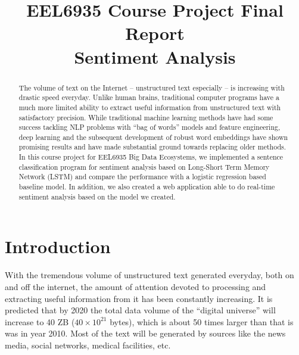 \documentclass[conference]{IEEEtran}
\begin{document}
\renewcommand{\figureautorefname}{Fig.}
\newcommand{\subfigureautorefname}{Fig.}
\renewcommand{\sectionautorefname}{Section}
\renewcommand{\subsectionautorefname}{Section}


\title{EEL6935 Course Project Final Report \\
    Sentiment Analysis}
\author{
}

\maketitle

\begin{abstract}
    The volume of text on the Internet -- unstructured text especially --
    is increasing with drastic speed everyday. Unlike human brains, traditional 
    computer programs have a much more limited ability to extract useful
    information from unstructured text with satisfactory precision.
    While traditional machine learning methods have had some success
    tackling NLP problems with ``bag of words'' models and feature engineering,
    deep learning and the subsequent development of robust word embeddings have shown
    promising results and have made substantial ground towards replacing older methods.
    In this course project for EEL6935 Big Data Ecosystems, we implemented a sentence 
    classification program for sentiment analysis based on Long-Short Term Memory Network 
    (LSTM) and compare the performance with a logistic regression based baseline model. 
    In addition, we also created a web application able to do real-time sentiment analysis
    based on the model we created. 
    
\end{abstract}

\IEEEpeerreviewmaketitle

\section{Introduction}
\label{intro}
    With the tremendous volume of unstructured text generated everyday, both on and off
    the internet, the amount of attention devoted to processing and extracting useful information
    from it has been constantly increasing. It is predicted that by 2020 the
    total data volume of the ``digital universe'' will increase to 40 ZB
    ($40\times 10^{21}$ bytes), which is about 50 times larger than that is was in
    year 2010\cite{gantz2012digital}. Most of the text will be generated by
    sources like the news media, social networks, medical facilities, etc.
\end{document}
